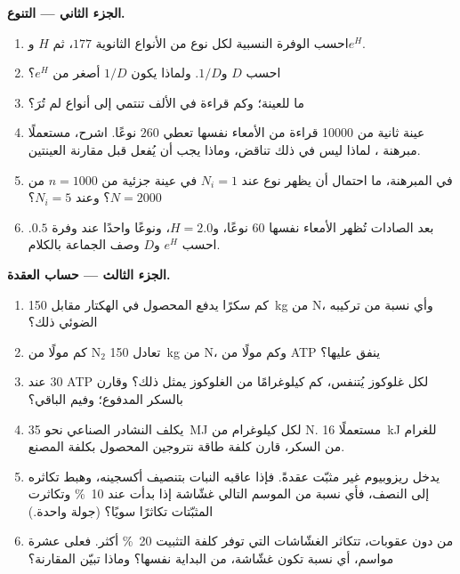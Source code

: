 \begin{problem}
\medskip
\noindent\textbf{الجزء الثاني --- التنوع.}
\begin{enumerate}[resume]
  \item احسب الوفرة النسبية لكل نوع من الأنواع الثانوية
        $177$، ثم  $H$ و$e^{H}$.
  \item احسب  $D$ و$1/D$. ولماذا يكون $1/D$
        أصغر من $e^{H}$؟
  \item ما  للعينة؛ وكم قراءة في الألف تنتمي إلى
        أنواع لم تُرَ؟
  \item عينة ثانية من \num{10000} قراءة من الأمعاء نفسها
        تعطي $260$ نوعًا. اشرح، مستعملًا مبرهنة ،
        لماذا ليس في ذلك تناقض، وماذا يجب أن يُفعل قبل
        مقارنة العينتين.
  \item في المبرهنة، ما احتمال أن يظهر نوع عند
        $N_{i} = 1$ في عينة جزئية من $n = 1000$ من $N =
        2000$؟ وعند $N_{i} = 5$؟
  \item بعد الصادات تُظهر الأمعاء نفسها $60$ نوعًا،
        و$H = 2.0$، ونوعًا واحدًا عند وفرة $0.5$. احسب
        $e^{H}$ و$D$ وصف الجماعة بالكلام.
\end{enumerate}

\medskip
\noindent\textbf{الجزء الثالث --- حساب العقدة.}
\begin{enumerate}[resume]
  \item كم سكرًا يدفع المحصول في الهكتار مقابل \qty{150}{kg}
        من N، وأي نسبة من تركيبه الضوئي ذلك؟
  \item كم مولًا من N$_{2}$ تعادل \qty{150}{kg} من N، وكم
        مولًا من ATP ينفق  عليها؟
  \item عند $30$ ATP لكل غلوكوز يُتنفس، كم كيلوغرامًا من
        الغلوكوز يمثل ذلك؟ وقارن بالسكر المدفوع؛ وفيم
        الباقي؟
  \item يكلف النشادر الصناعي نحو \qty{35}{MJ} لكل كيلوغرام
        من N. مستعملًا \qty{16}{kJ} للغرام من السكر، قارن
        كلفة طاقة نتروجين المحصول بكلفة المصنع.
  \item يدخل ريزوبيوم غير مثبّت عقدةً. فإذا عاقبه النبات
        بتنصيف أكسجينه، وهبط تكاثره إلى النصف، فأي نسبة من
         الموسم التالي غشّاشة إذا بدأت عند
        \qty{10}{\%} وتكاثرت المثبّتات تكاثرًا سويًا؟
        (جولة واحدة.)
  \item من دون عقوبات، تتكاثر الغشّاشات التي توفر كلفة
        التثبيت \qty{20}{\%} أكثر. فعلى عشرة مواسم، أي نسبة
        تكون غشّاشة، من البداية نفسها؟ وماذا تبيّن المقارنة؟
\end{enumerate}


\end{problem}
